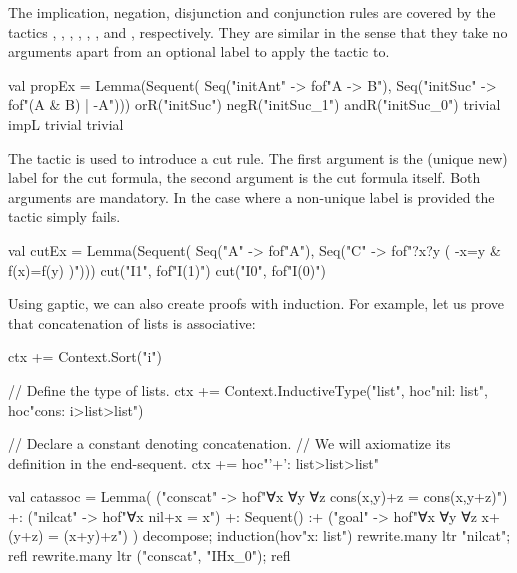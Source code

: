 \documentclass[a4paper,11pt]{article}
\newcommand{\cli}[1]{{\ttfamily {#1}}}
\begin{document}
The implication, negation, disjunction and conjunction rules are covered by the
tactics \cli{impL}, \cli{impR}, \cli{negL}, \cli{negR}, \cli{disL}, \cli{disR},
\cli{conL} and \cli{conR}, respectively. They are similar in the sense that
they take no arguments apart from an optional label to apply the tactic to.
\begin{tacticslisting}
val propEx = Lemma(Sequent(
    Seq("initAnt" -> fof"A -> B"),
    Seq("initSuc" -> fof"(A & B) | -A"))) {
  orR("initSuc")
  negR("initSuc_1")
  andR("initSuc_0")
  trivial
  impL
  trivial
  trivial
}
\end{tacticslisting}
\begin{tacticsoutput}
\end{tacticsoutput}

The \cli{cut} tactic is used to introduce a cut rule. The first argument is the
(unique new) label for the cut formula, the second argument is the cut formula
itself. Both arguments are mandatory. In the case where a non-unique label is
provided the tactic simply fails.
\begin{tacticslisting}
val cutEx = Lemma(Sequent(
    Seq("A" -> fof"A"),
    Seq("C" -> fof"?x?y ( -x=y & f(x)=f(y) )"))) {
  cut("I1", fof"I(1)")
  cut("I0", fof"I(0)")
}
\end{tacticslisting}

Using gaptic, we can also create proofs with induction.  For example, let us
prove that concatenation of lists is associative:

\begin{tacticslisting}[nosig]
ctx += Context.Sort("i")

// Define the type of lists.
ctx += Context.InductiveType("list",
  hoc"nil: list",
  hoc"cons: i>list>list")

// Declare a constant denoting concatenation.
// We will axiomatize its definition in the end-sequent.
ctx += hoc"'+': list>list>list"

val catassoc =
  Lemma(
      ("conscat" -> hof"∀x ∀y ∀z cons(x,y)+z = cons(x,y+z)") +:
      ("nilcat" -> hof"∀x nil+x = x") +:
      Sequent()
      :+ ("goal" -> hof"∀x ∀y ∀z x+(y+z) = (x+y)+z")
    ) {
  decompose; induction(hov"x: list")
  rewrite.many ltr "nilcat"; refl
  rewrite.many ltr ("conscat", "IHx_0"); refl
}
\end{tacticslisting}
\begin{tacticsoutput}
\end{tacticsoutput}
\end{document}
